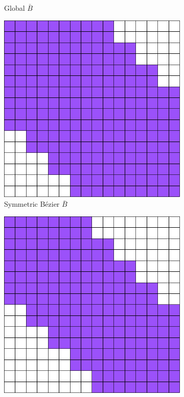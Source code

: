 \begin{figure}[!htb]
\begin{subfigure}[b]{0.47\linewidth}
        \caption{Global $\bar{B}$}
    \end{subfigure}
    \begin{subfigure}[b]{0.47\linewidth}        %
        \centering
        \includegraphics[width=\linewidth]{LB_extraction}
        \caption{Symmetric B\'ezier $\bar{B}$}
    \end{subfigure}
    \begin{subfigure}[b]{0.47\linewidth}        %
        \centering
        \includegraphics[width=\linewidth]{NS-LB_extraction}

\end{subfigure}
\end{figure}
